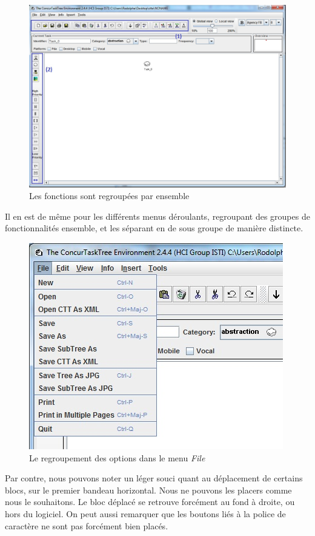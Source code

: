 \documentclass[12pt, a4paper]{article}
\begin{document}
\begin{figure}[h]
\begin{center}
   \includegraphics[scale = 0.5]{groupement.jpg}
	\caption{Les fonctions sont regroupées par ensemble}
	\end{center}
\end{figure}
Il en est de même pour les différents menus déroulants, regroupant des groupes de fonctionnalités ensemble, et les séparant en de sous groupe de manière distincte.
\begin{figure}[h]
\begin{center}
   \includegraphics[scale = 0.5]{menusderoulant.jpg}
	\caption{Le regroupement des options dans le menu \emph{File}}
	\end{center}
\end{figure}

\newpage
Par contre, nous pouvons noter un léger souci quant au déplacement de certains blocs, sur le premier bandeau horizontal. Nous ne pouvons les placers comme nous le souhaitons. Le bloc déplacé se retrouve forcément au fond à droite, ou hors du logiciel. On peut aussi remarquer que les boutons liés à la police de caractère ne sont pas forcément bien placés.\\ 
\end{document}
